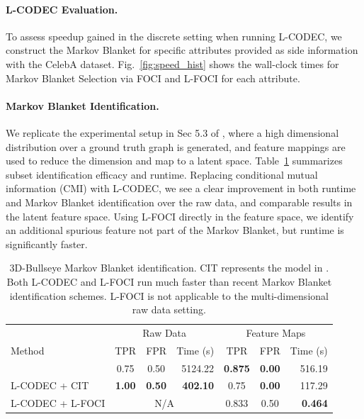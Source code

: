 \paragraph{L-CODEC Evaluation.}
To assess speedup gained in the discrete setting when running L-CODEC,
we construct the Markov Blanket for specific attributes provided as side information with the CelebA dataset. Fig.~\ref{fig:speed_hist} shows the wall-clock times for Markov Blanket Selection via FOCI and L-FOCI for each attribute.

\paragraph{Markov Blanket Identification.} We replicate the experimental setup in Sec 5.3 of \cite{bullseye}, where a high dimensional distribution over a ground truth graph is generated, and feature mappings are used to reduce the dimension and map to a latent space. Table~\ref{tab:bullseye} summarizes subset identification efficacy and runtime. Replacing conditional mutual information (CMI) with L-CODEC, we see a clear improvement in both runtime and Markov Blanket identification over the raw data, and comparable results in the latent feature space. Using L-FOCI directly in the feature space, we identify an additional spurious feature not part of the Markov Blanket, but runtime is significantly faster.
\begin{table}
    \centering
    \begin{tabular}[b]{l|ccr|ccr}
        \hline\hline
        & \multicolumn{3}{c|}{Raw Data} & \multicolumn{3}{c}{Feature Maps} \\
        Method & TPR & FPR & Time (s) & TPR & FPR & Time (s) \\
        \hline
        \cite{bullseye} & 0.75 & 0.50 & 5124.22 & \textbf{0.875} & \textbf{0.00} & 516.19 \\
        L-CODEC + CIT & \textbf{1.00} & \textbf{0.50} & \textbf{402.10} & 0.75 & \textbf{0.00} & 117.29 \\
        L-CODEC + L-FOCI & \multicolumn{3}{c|}{N/A} & 0.833 & 0.50 & \textbf{0.464} \\
        \hline\hline
    \end{tabular}
    \caption{\label{tab:bullseye} 3D-Bullseye Markov Blanket identification. CIT represents the model in \cite{bullseye}. Both L-CODEC and L-FOCI run much faster than recent Markov Blanket identification schemes. L-FOCI is not applicable to the multi-dimensional raw data setting.}
\end{table}
